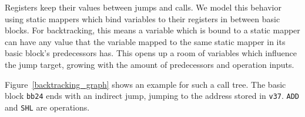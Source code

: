 \documentclass[course=eragp]{aspdoc}
\begin{document}
\par

Registers keep their values between jumps and calls. We model this behavior using static mappers
which bind variables to their registers in between basic blocks. For backtracking, this means a
variable which is bound to a static mapper can have any value that the variable mapped to the same
static mapper in its basic block's predecessors has. This opens up a room of variables which
influence the jump target, growing with the amount of predecessors and operation inputs.

\par

Figure~\ref{backtracking_graph} shows an example for such a call tree. The basic block \texttt{bb24} ends
with an indirect jump, jumping to the address stored in \texttt{v37}. \texttt{ADD} and \texttt{SHL} are operations.
\end{document}
